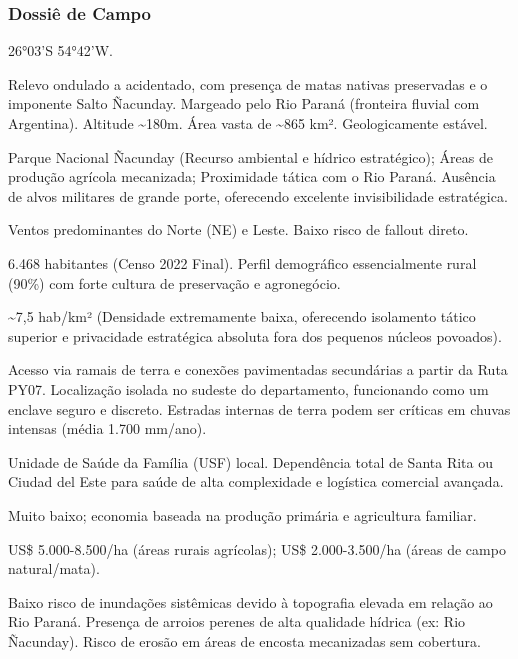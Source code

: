 \subsubsection{Dossiê de Campo}
\begin{description}[style=nextline,leftmargin=0.5cm,font=\bfseries]
\item[Coordenadas]  26°03'S 54°42'W.
\item[Topografia]  Relevo ondulado a acidentado, com presença de matas nativas preservadas e o imponente Salto Ñacunday. Margeado pelo Rio Paraná (fronteira fluvial com Argentina). Altitude \textasciitilde 180m. Área vasta de \textasciitilde 865 km². Geologicamente estável.
\item[Alvos Estratégicos]  Parque Nacional Ñacunday (Recurso ambiental e hídrico estratégico); Áreas de produção agrícola mecanizada; Proximidade tática com o Rio Paraná. Ausência de alvos militares de grande porte, oferecendo excelente invisibilidade estratégica.
\item[Fallout]  Ventos predominantes do Norte (NE) e Leste. Baixo risco de fallout direto.
\item[População]  6.468 habitantes (Censo 2022 Final). Perfil demográfico essencialmente rural (90\%) com forte cultura de preservação e agronegócio.
\item[Densidade]  \textasciitilde 7,5 hab/\allowbreak km² (Densidade extremamente baixa, oferecendo isolamento tático superior e privacidade estratégica absoluta fora dos pequenos núcleos povoados).
\item[Vias de Acesso]  Acesso via ramais de terra e conexões pavimentadas secundárias a partir da Ruta PY07. Localização isolada no sudeste do departamento, funcionando como um enclave seguro e discreto. Estradas internas de terra podem ser críticas em chuvas intensas (média 1.700 mm/\allowbreak ano).
\item[Serviços]  Unidade de Saúde da Família (USF) local. Dependência total de Santa Rita ou Ciudad del Este para saúde de alta complexidade e logística comercial avançada.
\item[Custo de Vida]  Muito baixo; economia baseada na produção primária e agricultura familiar.
\item[Preço da Terra]  US\$ 5.000-8.500/\allowbreak ha (áreas rurais agrícolas); US\$ 2.000-3.500/\allowbreak ha (áreas de campo natural/\allowbreak mata).
\item[Hidrologia]  Baixo risco de inundações sistêmicas devido à topografia elevada em relação ao Rio Paraná. Presença de arroios perenes de alta qualidade hídrica (ex: Rio Ñacunday). Risco de erosão em áreas de encosta mecanizadas sem cobertura.

\end{description}
